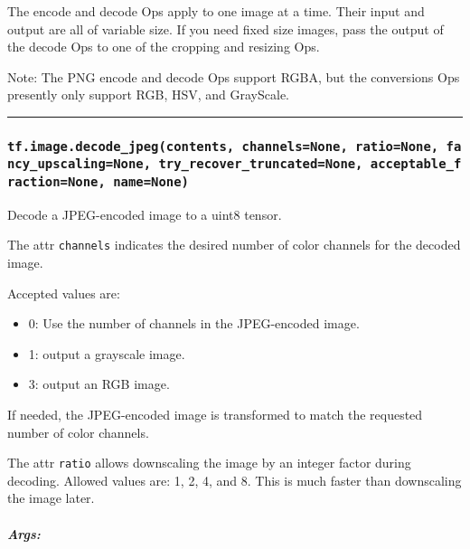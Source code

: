 The encode and decode Ops apply to one image at a time. Their input and
output are all of variable size. If you need fixed size images, pass the
output of the decode Ops to one of the cropping and resizing Ops.

Note: The PNG encode and decode Ops support RGBA, but the conversions
Ops presently only support RGB, HSV, and GrayScale.

\begin{center}\rule{0.5\linewidth}{\linethickness}\end{center}

\subsubsection{\texorpdfstring{\texttt{tf.image.decode\_jpeg(contents,\ channels=None,\ ratio=None,\ fancy\_upscaling=None,\ try\_recover\_truncated=None,\ acceptable\_fraction=None,\ name=None)}
}{tf.image.decode\_jpeg(contents, channels=None, ratio=None, fancy\_upscaling=None, try\_recover\_truncated=None, acceptable\_fraction=None, name=None) }}\label{tf.image.decodeux5fjpegcontents-channelsnone-rationone-fancyux5fupscalingnone-tryux5frecoverux5ftruncatednone-acceptableux5ffractionnone-namenone}

Decode a JPEG-encoded image to a uint8 tensor.

The attr \texttt{channels} indicates the desired number of color
channels for the decoded image.

Accepted values are:

\begin{itemize}
\tightlist
\item
  0: Use the number of channels in the JPEG-encoded image.
\item
  1: output a grayscale image.
\item
  3: output an RGB image.
\end{itemize}

If needed, the JPEG-encoded image is transformed to match the requested
number of color channels.

The attr \texttt{ratio} allows downscaling the image by an integer
factor during decoding. Allowed values are: 1, 2, 4, and 8. This is much
faster than downscaling the image later.

\subparagraph{Args: }\label{args}

